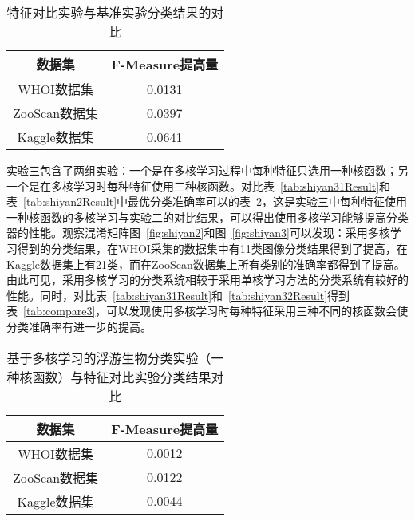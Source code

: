 \begin{table}[htbp]
\small
  \centering
  \caption{特征对比实验与基准实验分类结果的对比}
  \label{tab:compare1and2}
  \begin{tabular}[c]{cc}
    \toprule
    数据集 & F-Measure提高量\\
    \midrule
    WHOI数据集 & 0.0131\\
    ZooScan数据集 & 0.0397\\
    Kaggle数据集 & 0.0641\\
    \bottomrule
  \end{tabular}
\end{table}


实验三包含了两组实验：一个是在多核学习过程中每种特征只选用一种核函数；另一个是在多核学习时每种特征使用三种核函数。对比表~\ref{tab:shiyan31Result}和表~\ref{tab:shiyan2Result}中最优分类准确率可以的表~\ref{tab:compare31and2}，这是实验三中每种特征使用一种核函数的多核学习与实验二的对比结果，可以得出使用多核学习能够提高分类器的性能。观察混淆矩阵图~\ref{fig:shiyan2}和图~\ref{fig:shiyan3}可以发现：采用多核学习得到的分类结果，在WHOI采集的数据集中有11类图像分类结果得到了提高，在Kaggle数据集上有21类，而在ZooScan数据集上所有类别的准确率都得到了提高。由此可见，采用多核学习的分类系统相较于采用单核学习方法的分类系统有较好的性能。同时，对比表~\ref{tab:shiyan31Result}和~\ref{tab:shiyan32Result}得到表~\ref{tab:compare3}，可以发现使用多核学习时每种特征采用三种不同的核函数会使分类准确率有进一步的提高。

\begin{table}[htbp]
\small
  \centering
  \caption{基于多核学习的浮游生物分类实验（一种核函数）与特征对比实验分类结果对比}
  \label{tab:compare31and2}
  \begin{tabular}[c]{cc}
    \toprule
    数据集 & F-Measure提高量\\
    \midrule
    WHOI数据集 & 0.0012\\
    ZooScan数据集 & 0.0122\\
    Kaggle数据集 & 0.0044\\
    \bottomrule
  \end{tabular}
\end{table}

